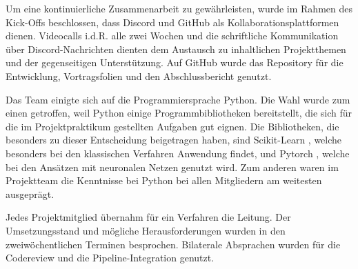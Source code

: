Um eine kontinuierliche Zusammenarbeit zu gewährleisten, wurde im Rahmen des Kick-Offs beschlossen, dass Discord
und GitHub
als Kollaborationsplattformen dienen. Videocalls i.d.R. alle zwei Wochen und die schriftliche Kommunikation über Discord-Nachrichten dienten dem Austausch zu inhaltlichen Projektthemen und der gegenseitigen Unterstützung. Auf GitHub wurde das Repository \cite{Suxdorf2025Quality} für die Entwicklung, Vortragsfolien und den Abschlussbericht genutzt. %

\label{Programmiersprache}
Das Team einigte sich auf die Programmiersprache Python.
Die Wahl wurde zum einen getroffen, weil Python einige Programmbibliotheken bereitstellt, die sich für die im Projektpraktikum gestellten Aufgaben gut eignen. Die Bibliotheken, die besonders zu dieser Entscheidung beigetragen haben, sind Scikit-Learn \cite{Pedregosa2011}, welche besonders bei den klassischen Verfahren Anwendung findet, und Pytorch \cite{Ansel2024}, welche bei den Ansätzen mit neuronalen Netzen genutzt wird. Zum anderen waren im Projektteam die Kenntnisse bei Python bei allen Mitgliedern am weitesten ausgeprägt.

Jedes Projektmitglied übernahm für ein Verfahren die Leitung. Der Umsetzungsstand und mögliche Herausforderungen wurden in den zweiwöchentlichen Terminen besprochen. Bilaterale Absprachen wurden für die Codereview und die Pipeline-Integration genutzt.
